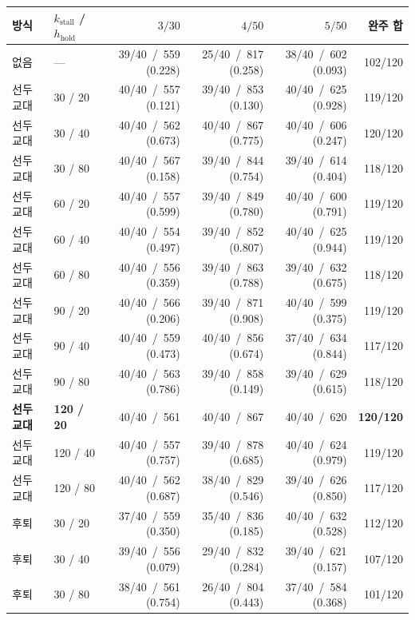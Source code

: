 \begin{tabular}{llrrrr}
\toprule
방식 & $k_{\mathrm{stall}}$ / $h_{\mathrm{hold}}$ & $3/30$ & $4/50$ & $5/50$ & 완주 합 \\
\midrule
없음 & --- & 39/40 \,/\, 559 (0.228) & 25/40 \,/\, 817 (0.258) & 38/40 \,/\, 602 (0.093) & 102/120 \\
선두 교대 & 30 / 20 & 40/40 \,/\, 557 (0.121) & 39/40 \,/\, 853 (0.130) & 40/40 \,/\, 625 (0.928) & 119/120 \\
선두 교대 & 30 / 40 & 40/40 \,/\, 562 (0.673) & 40/40 \,/\, 867 (0.775) & 40/40 \,/\, 606 (0.247) & 120/120 \\
선두 교대 & 30 / 80 & 40/40 \,/\, 567 (0.158) & 39/40 \,/\, 844 (0.754) & 39/40 \,/\, 614 (0.404) & 118/120 \\
선두 교대 & 60 / 20 & 40/40 \,/\, 557 (0.599) & 39/40 \,/\, 849 (0.780) & 40/40 \,/\, 600 (0.791) & 119/120 \\
선두 교대 & 60 / 40 & 40/40 \,/\, 554 (0.497) & 39/40 \,/\, 852 (0.807) & 40/40 \,/\, 625 (0.944) & 119/120 \\
선두 교대 & 60 / 80 & 40/40 \,/\, 556 (0.359) & 39/40 \,/\, 863 (0.788) & 39/40 \,/\, 632 (0.675) & 118/120 \\
선두 교대 & 90 / 20 & 40/40 \,/\, 566 (0.206) & 39/40 \,/\, 871 (0.908) & 40/40 \,/\, 599 (0.375) & 119/120 \\
선두 교대 & 90 / 40 & 40/40 \,/\, 559 (0.473) & 40/40 \,/\, 856 (0.674) & 37/40 \,/\, 634 (0.844) & 117/120 \\
선두 교대 & 90 / 80 & 40/40 \,/\, 563 (0.786) & 39/40 \,/\, 858 (0.149) & 39/40 \,/\, 629 (0.615) & 118/120 \\
\textbf{선두 교대} & \textbf{120 / 20} & 40/40 \,/\, 561 & 40/40 \,/\, 867 & 40/40 \,/\, 620 & \textbf{120/120} \\
선두 교대 & 120 / 40 & 40/40 \,/\, 557 (0.757) & 39/40 \,/\, 878 (0.685) & 40/40 \,/\, 624 (0.979) & 119/120 \\
선두 교대 & 120 / 80 & 40/40 \,/\, 562 (0.687) & 38/40 \,/\, 829 (0.546) & 39/40 \,/\, 626 (0.850) & 117/120 \\
후퇴 & 30 / 20 & 37/40 \,/\, 559 (0.350) & 35/40 \,/\, 836 (0.185) & 40/40 \,/\, 632 (0.528) & 112/120 \\
후퇴 & 30 / 40 & 39/40 \,/\, 556 (0.079) & 29/40 \,/\, 832 (0.284) & 39/40 \,/\, 621 (0.157) & 107/120 \\
후퇴 & 30 / 80 & 38/40 \,/\, 561 (0.754) & 26/40 \,/\, 804 (0.443) & 37/40 \,/\, 584 (0.368) & 101/120 \\

\end{tabular}

